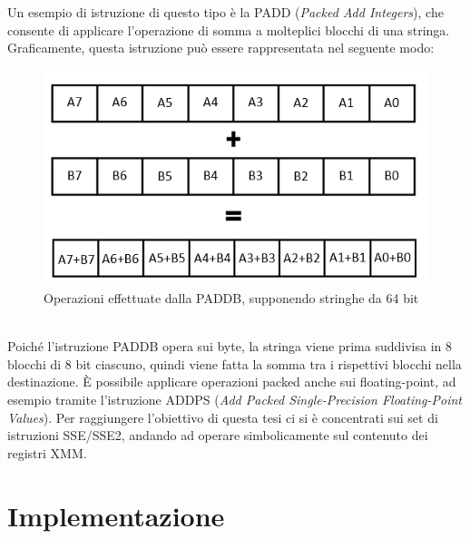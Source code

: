 \documentclass[Lau, oneside]{sapthesis}%
\begin{document}
\newpage
Un esempio di istruzione di questo tipo è la PADD (\textit{Packed Add Integers}), che consente di applicare l'operazione di somma a molteplici blocchi di una stringa.
\newline
Graficamente, questa istruzione può essere rappresentata nel seguente modo:
\begin{figure}[h]
    \centering
    \includegraphics[width=0.75\linewidth]{foto/packed_add.png}
    \captionsetup{format=hang}
    \caption{Operazioni effettuate dalla PADDB, supponendo stringhe da 64 bit}
    \label{fig:padd}
\end{figure}
\ \\ \newline
Poiché l'istruzione PADDB opera sui byte, la stringa viene prima suddivisa in 8 blocchi di 8 bit ciascuno, quindi viene fatta la somma tra i rispettivi blocchi nella destinazione.
\newline
È possibile applicare operazioni packed anche sui floating-point, ad esempio tramite l'istruzione ADDPS (\textit{Add Packed Single-Precision Floating-Point Values}).
\newline \newline \newline
Per raggiungere l'obiettivo di questa tesi ci si è concentrati sui set di istruzioni SSE/SSE2, andando ad operare simbolicamente sul contenuto dei registri XMM.





\chapter{Implementazione}
\ \\
\end{document}
